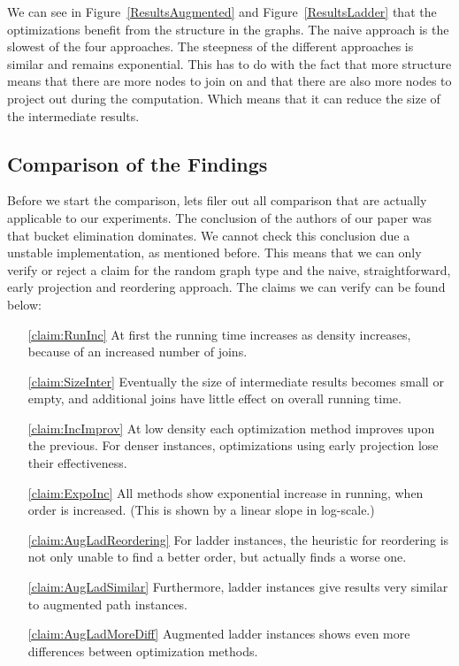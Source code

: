 We can see in Figure~\ref{ResultsAugmented} and Figure~\ref{ResultsLadder} that the optimizations benefit from the structure in the graphs. The naive approach is the slowest of the four approaches. The steepness of the different approaches is similar and remains exponential. This has to do with the fact that more structure means that there are more nodes to join on and that there are also more nodes to project out during the computation. Which means that it can reduce the size of the intermediate results.

\subsection{Comparison of the Findings} \label{subsec:DissComparison}
Before we start the comparison, lets filer out all comparison that are actually applicable to our experiments. The conclusion of the authors of our paper \cite{paper} was that bucket elimination dominates. We cannot check this conclusion due a unstable implementation, as mentioned before. This means that we can only verify or reject a claim for the random graph type and the naive, straightforward, early projection and reordering approach. The claims we can verify can be found below: 

\begin{enumerate}
\item[\ref{claim:RunInc}] At first the running time increases as density increases, because of an increased number of joins.
\item[\ref{claim:SizeInter}] Eventually the size of intermediate results becomes small or empty, and additional joins have little effect on overall running time.
\item[\ref{claim:IncImprov}] At low density each optimization method improves upon the previous. For denser instances, optimizations using early projection lose their effectiveness.
\item[\ref{claim:ExpoInc}] All methods show exponential increase in running, when order is increased. (This is shown by a linear slope in log-scale.)
\item[\ref{claim:AugLadReordering}] For ladder instances, the heuristic for reordering is not only unable to find a better order, but actually finds a worse one.
\item[\ref{claim:AugLadSimilar}] Furthermore, ladder instances give results very similar to augmented path instances.
\item[\ref{claim:AugLadMoreDiff}] Augmented ladder instances shows even more differences between optimization methods.
\end{enumerate}

